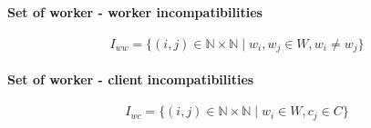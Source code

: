 \documentclass[../../thesis.tex]{subfiles}
\begin{document}
\paragraph{Set of worker - worker incompatibilities}

\begin{equation*}
    {I_{ww} = \{ ({i},{j}) \in \mathbb{N} \times \mathbb{N} \mid w_i, w_j \in W, w_i \neq w_j \}}
\end{equation*}


\paragraph{Set of worker - client incompatibilities}
\begin{equation*}
    I_{wc} = \{ (i, j) \in \mathbb{N} \times \mathbb{N} \mid w_i \in W, c_j \in C \}
\end{equation*}
\end{document}
